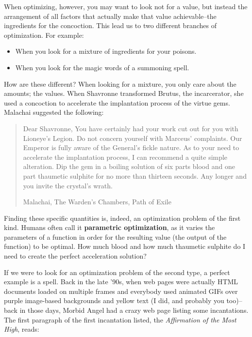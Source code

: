 \documentclass[titlepage, letterpaper, oneside]{book}
\newcommand{\magicword}[1]{%
\textbf{#1}\marginnote{\textfrak{#1}}}
\begin{document}
When optimizing, however, you may want to look not for a value, but instead the arrangement of all factors that actually make that value achievable--the ingredients for the concoction.
This lead us to two different branches of optimization. For example:

\begin{itemize}
	\item When you look for a mixture of ingredients for your poisons.
	\item When you look for the magic words of a summoning spell.
\end{itemize}

How are these different?
When looking for a mixture, you only care about the amounts; the values. When Shavronne transformed Brutus, the incarcerator, she used a concoction to accelerate the implantation process of the virtue gems. Malachai suggested the following:

\blockquote[Malachai, The Warden's Chambers, Path of Exile]{Dear Shavronne,
You have certainly had your work cut out for you with Lioneye's Legion. Do not concern yourself with Marceus' complaints. Our Emperor is fully aware of the General's fickle nature.
As to your need to accelerate the implantation process, I can recommend a quite simple alteration. Dip the gem in a boiling solution of six parts blood and one part thaumetic sulphite for no more than thirteen seconds. Any longer and you invite the crystal's wrath.}

Finding these specific quantities is, indeed, an optimization problem of the first kind.
Humans often call it \magicword{parametric optimization}, as it varies the parameters of a function in order for the resulting value (the output of the function) to be optimal.
How much blood and how much thaumetic sulphite do I need to create the perfect acceleration solution?

If we were to look for an optimization problem of the second type, a perfect example is a spell. Back in the late '90s, when web pages were actually \textsc{HTML} documents loaded on multiple frames and everybody used animated GIFs over purple image-based backgrounds and yellow text (I did, and probably you too)--back in those days, Morbid Angel had a crazy web page listing some incantations. The first paragraph of the first incantation listed, the \textit{Affirmation of the Most High}, reads:
\end{document}
